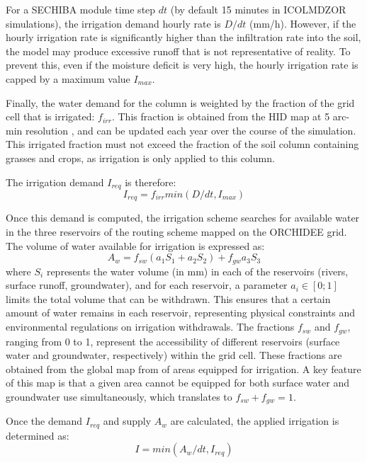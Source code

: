 For a SECHIBA module time step $dt$ (by default 15 minutes in ICOLMDZOR simulations), the irrigation demand hourly rate is $D/dt$ (mm/h). However, if the hourly irrigation rate is significantly higher than the infiltration rate into the soil, the model may produce excessive runoff that is not representative of reality. To prevent this, even if the moisture deficit is very high, the hourly irrigation rate is capped by a maximum value $I_{max}$.

Finally, the water demand for the column is weighted by the fraction of the grid cell that is irrigated: $f_{irr}$. This fraction is obtained from the HID map at 5 arc-min resolution \citep{siebert_quantifying_2010}, and can be updated each year over the course of the simulation.
This irrigated fraction must not exceed the fraction of the soil column containing grasses and crops, as irrigation is only applied to this column.

The irrigation demand $I_{req}$ is therefore:
\begin{equation}
    I_{req} = f_{irr} min(D/dt, I_{max})
\end{equation}

Once this demand is computed, the irrigation scheme searches for available water in the three reservoirs of the routing scheme mapped on the ORCHIDEE grid.
The volume of water available for irrigation is expressed as:
\begin{equation}
    A_w = f_{sw} (a_1 S_1 + a_2 S_2)+ f_{gw}a_3 S_3
\end{equation}
where $S_i$ represents the water volume (in mm) in each of the reservoirs (rivers, surface runoff, groundwater), and for each reservoir, a parameter $a_i \in [0;1]$ limits the total volume that can be withdrawn. This ensures that a certain amount of water remains in each reservoir, representing physical constraints and environmental regulations on irrigation withdrawals.
The fractions $f_{sw}$ and $f_{gw}$, ranging from 0 to 1, represent the accessibility of different reservoirs (surface water and groundwater, respectively) within the grid cell. These fractions are obtained from the global map from \citet{siebert_groundwater_2010} of areas equipped for irrigation. A key feature of this map is that a given area cannot be equipped for both surface water and groundwater use simultaneously, which translates to $f_{sw} + f_{gw} =1$.

Once the demand $I_{req}$ and supply $A_w$ are calculated, the applied irrigation is determined as:
\begin{equation}
    I = min(A_w/dt, I_{req})
\end{equation}

